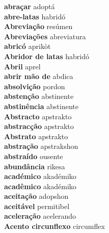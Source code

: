\textbf{ abraçar  } adoptá \\
\textbf{ abre-latas  } habridó \\
\textbf{ Abreviação  } resúmen \\
\textbf{ Abreviações  } abreviatura \\
\textbf{ abricó  } aprikòt \\
\textbf{ Abridor de latas  } habridó \\
\textbf{ Abril  } aprel \\
\textbf{ abrir mão de  } abdica \\
\textbf{ absolvição  } pordon \\
\textbf{ abstenção  } abstinente \\
\textbf{ abstinência  } abstinente \\
\textbf{ Abstracto  } apstrakto \\
\textbf{ abstracção  } apstrakto \\
\textbf{ Abstrato  } apstrakto \\
\textbf{ abstração  } apstrakshon \\
\textbf{ abstraído  } ousente \\
\textbf{ abundância  } rikesa \\
\textbf{ académico  } akadémiko \\
\textbf{ acadêmico  } akadémiko \\
\textbf{ aceitação  } adopshon \\
\textbf{ aceitável  } permitibel \\
\textbf{ aceleração  } acelerando \\
\textbf{ Acento circunflexo  } circumflex \\
